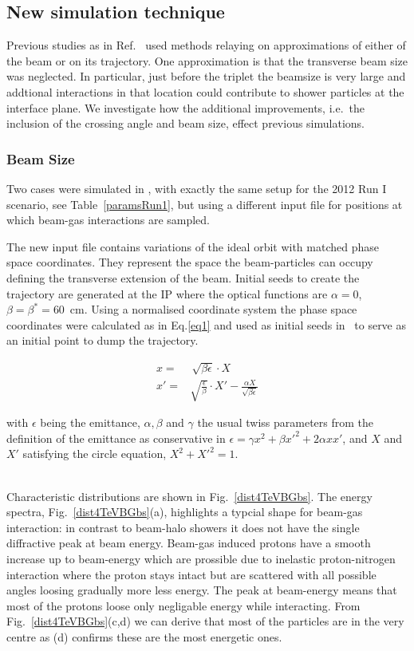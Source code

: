 \subsection{New simulation technique}
Previous studies as in Ref.~\cite{nimPaperRod} used methods relaying on approximations of either of the beam or on its trajectory. One approximation is that the transverse beam size was neglected. In particular, just before the triplet the beamsize is very large and addtional interactions in that location could contribute to shower particles at the interface plane. We investigate how the additional improvements, i.e.~the inclusion of the crossing angle and beam size, effect previous simulations. 

\subsubsection{Beam Size}
Two cases were simulated in \fluka, with exactly the same setup for the 2012 Run I scenario, see Table~\ref{paramsRun1}, but using a different input file for positions at which beam-gas interactions are sampled.

The new input file contains variations of the ideal orbit with matched phase space coordinates. They represent the space the beam-particles can occupy defining the transverse extension of the beam. Initial seeds to create the trajectory are generated at the IP where the optical functions are $\alpha = 0$, $\beta = \beta^* = 60$~cm. Using a normalised coordinate system the phase space coordinates were calculated as in Eq.\ref{eq1} and used as initial seeds in \fluka~to serve as an initial point to dump the trajectory.


\begin{equation} \label{eq1}
  \begin{split}
x = & \, \sqrt{\beta \epsilon} \cdot X \\
x' = & \sqrt{\frac{\epsilon}{\beta}} \cdot X' - \frac{\alpha X}{\sqrt{\beta \epsilon}}
  \end{split}
\end{equation}

with $\epsilon$ being the emittance, $\alpha, \beta$ and $\gamma$ the usual twiss parameters from the definition of the emittance as conservative in $\epsilon = \gamma x^2 + \beta x'^2 + 2 \alpha x x'$, and $X$ and $X'$ satisfying the circle equation, $X^2 + X'^2 = 1$. 

{\\}
Characteristic distributions are shown in Fig.~\ref{dist4TeVBGbs}. The energy spectra, Fig.~\ref{dist4TeVBGbs}(a), highlights a typcial shape for beam-gas interaction: in contrast to beam-halo showers it does not have the single diffractive peak at beam energy. Beam-gas induced protons have a smooth increase up to beam-energy which are prossible due to inelastic proton-nitrogen interaction where the proton stays intact but are scattered with all possible angles loosing gradually more less energy. The peak at beam-energy means that most of the protons loose only negligable energy while interacting. From Fig.~\ref{dist4TeVBGbs}(c,d) we can derive that most of the particles are in the very centre as (d) confirms these are the most energetic ones. 

